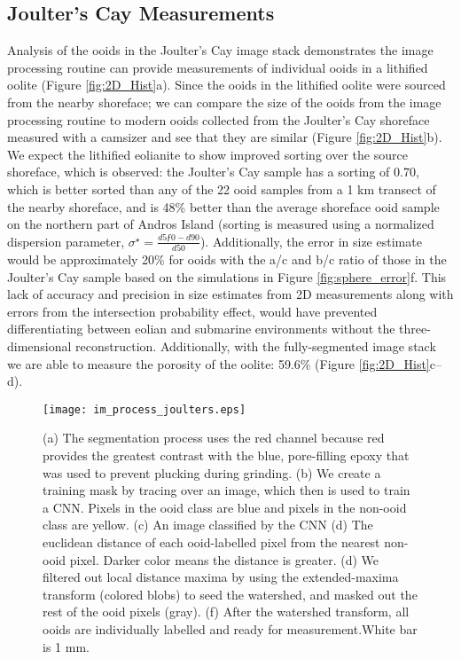 \documentclass[draft]{agujournal2019}
\begin{document}
\subsection{Joulter's Cay Measurements}
Analysis of the ooids in the Joulter's Cay image stack demonstrates the image processing routine can provide measurements of individual ooids in a lithified oolite (Figure \ref{fig:2D_Hist}a). Since the ooids in the lithified oolite were sourced from the nearby shoreface; we can compare the size of the ooids from the image processing routine to modern ooids collected from the Joulter's Cay shoreface measured with a camsizer and see that they are similar (Figure \ref{fig:2D_Hist}b). We expect the lithified eolianite to show improved sorting over the source shoreface, which is observed: the Joulter's Cay sample has a sorting of 0.70, which is better sorted than any of the 22 ooid samples from a 1 km transect of the nearby shoreface, and is 48\% better than the average shoreface ooid sample on the northern part of Andros Island (sorting is measured using a normalized dispersion parameter, \(\sigma^{\star} = \frac{d5ƒ0 - d90}{d50}\)). Additionally, the error in size estimate would be approximately 20\% for ooids with the a/c and b/c ratio of those in the Joulter's Cay sample based on the simulations in Figure \ref{fig:sphere_error}f. This lack of accuracy and precision in size estimates from 2D measurements along with errors from the intersection probability effect, would have prevented differentiating between eolian and submarine environments without the three-dimensional reconstruction. Additionally, with the fully-segmented image stack we are able to measure the porosity of the oolite: 59.6\% (Figure \ref{fig:2D_Hist}c--d).  



\begin{figure}
    \centering
    \texttt{[image: im\_process\_joulters.eps]}
    \caption{ (a) The segmentation process uses the red channel because red provides the greatest contrast with the blue, pore-filling epoxy that was used to prevent plucking during grinding. (b) We create a training mask by tracing over an image, which then is used to train a CNN. Pixels in the ooid class are blue and pixels in the non-ooid class are yellow. (c) An image classified by the CNN (d) The euclidean distance of each ooid-labelled pixel from the nearest non-ooid pixel. Darker color means the distance is greater. (d) We filtered out local distance maxima by using the extended-maxima transform (colored blobs) to seed the watershed, and masked out the rest of the ooid pixels (gray). (f) After the watershed transform, all ooids are individually labelled and ready for measurement.White bar is 1 mm.
    }
    \label{fig:seg_routine}
\end{figure}
\end{document}
